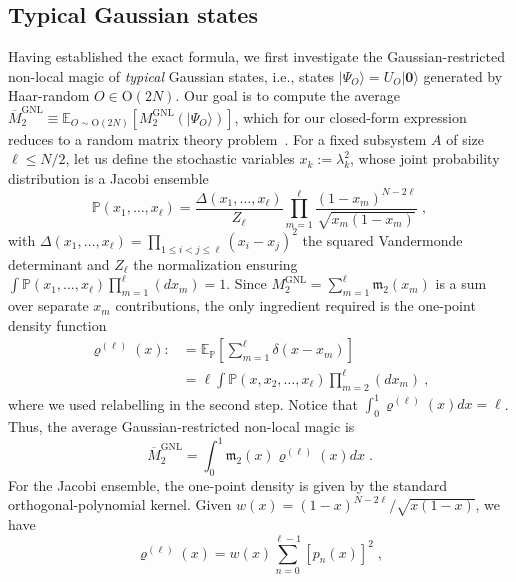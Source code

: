 \documentclass[prx,twocolumn,superscriptaddress,aps,10pt, frontmatterverbose, reprint,footinbib,longbibliography=true]{revtex4-2}
\begin{document}
\subsection{Typical Gaussian states}
Having established the exact formula, we first investigate the Gaussian-restricted non-local magic of \emph{typical} Gaussian states, i.e., states $|\Psi_O\rangle=U_O|\mathbf{0}\rangle$ generated by Haar-random $O\in \mathrm{O}(2N)$.
Our goal is to compute the average $\overline{M}_2^\mathrm{GNL}\equiv \mathbb{E}_{O\sim \mathrm{O}(2N)}[M_2^\mathrm{GNL}(|\Psi_O\rangle)]$, which for our closed-form expression reduces to a random matrix theory problem~\cite{Mehta2004,Livan_2018,vidmar2017entanglement}.
For a fixed subsystem $A$ of size $\ell\le N/2$, let us define the stochastic variables $x_k:=\lambda_k^2$, whose joint probability distribution is a Jacobi ensemble~\cite{Mehta2004}
\begin{equation}
    \mathbb{P}(x_1,\dots,x_\ell) = \frac{\Delta(x_1,\dots,x_\ell)}{Z_\ell}  \prod_{m=1}^\ell \frac{(1-x_m)^{N-2\ell}}{\sqrt{x_m(1-x_m)}}\;,
\end{equation}
with $\Delta(x_1,\dots,x_\ell)=\prod_{1\le i<j\le \ell} (x_i-x_j)^2$ the squared Vandermonde determinant  and $Z_\ell$ the normalization ensuring $\int \mathbb{P}(x_1,\dots,x_\ell)\prod_{m=1}^\ell (dx_m)=1$. 
Since $M_2^\mathrm{GNL}=\sum_{m=1}^\ell \mathfrak{m}_2(x_m)$ is a sum over separate $x_m$ contributions, the only ingredient required is the one-point density function 
\begin{equation}
\begin{split}
    \varrho^{(\ell)}(x):&=\mathbb{E}_\mathbb{P}\left[\sum_{m=1}^\ell \delta(x-x_m)\right] \\&= \ell \int \mathbb{P}(x,x_2,\dots,x_\ell)\prod_{m=2}^\ell (dx_m)\:,
\end{split}
\end{equation}
where we used relabelling in the second step. Notice that $\int_0^1 \varrho^{(\ell)}(x) dx = \ell$.
Thus, the average Gaussian-restricted non-local magic is 
\begin{equation}
    \overline{M}_2^\mathrm{GNL}=\int_0^1 \mathfrak{m}_2(x) \varrho^{(\ell)}(x) dx\;.
\end{equation}
For the Jacobi ensemble, the one-point density is given by the standard orthogonal-polynomial kernel.
Given $w(x) = (1-x)^{N-2\ell}/\sqrt{x(1-x)}$, we have~\cite{sierant2026theorymatchgatecommutant,sierant2026fermionic}
\begin{equation}
\varrho^{(\ell)}(x) = w(x) \sum_{n=0}^{\ell-1} [p_n(x)]^2\;,
\label{eq:ziopino}
\end{equation}
\end{document}

